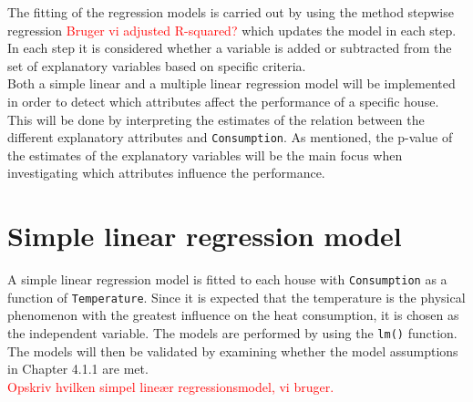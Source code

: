 \noindent The fitting of the regression models is carried out by using the method stepwise regression \textcolor{red}{Bruger vi adjusted R-squared?} which updates the model in each step. In each step it is considered whether a variable is added or subtracted from the set of explanatory variables based on specific criteria. \\

\noindent Both a simple linear and a multiple linear regression model will be implemented in order to detect which attributes affect the performance of a specific house. This will be done by interpreting the estimates of the relation between the different explanatory attributes and \texttt{Consumption}. As mentioned, the p-value of the estimates of the explanatory variables will be the main focus when investigating which attributes influence the performance.

\section{Simple linear regression model}
A simple linear regression model is fitted to each house with \texttt{Consumption} as a function of \texttt{Temperature}. Since it is expected that the temperature is the physical phenomenon with the greatest influence on the heat consumption, it is chosen as the independent variable. The models are performed by using the \texttt{lm()} function. The models will then be validated by examining whether the model assumptions in Chapter 4.1.1 are met. \\

\noindent \textcolor{red}{Opskriv hvilken simpel lineær regressionsmodel, vi bruger.}

